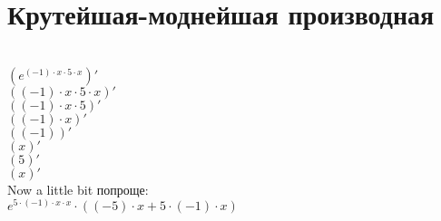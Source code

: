 \documentclass[a4paper,12pt]{article}
\begin{document}
\section*{Крутейшая-моднейшая производная}\\
\begin{math}
	( e^{(-1) \cdot x \cdot 5 \cdot x} )'
\end{math}\\
\begin{math}
	((-1) \cdot x \cdot 5 \cdot x)'
\end{math}\\
\begin{math}
	((-1) \cdot x \cdot 5)'
\end{math}\\
\begin{math}
	((-1) \cdot x)'
\end{math}\\
\begin{math}
	((-1))'
\end{math}\\
\begin{math}
	(x)'
\end{math}\\
\begin{math}
	(5)'
\end{math}\\
\begin{math}
	(x)'
\end{math}\\
Now a little bit попроще:\\
\begin{math}
	 e^{5 \cdot (-1) \cdot x \cdot x}  \cdot ((-5) \cdot x + 5 \cdot (-1) \cdot x)
\end{math}
\end{document}
